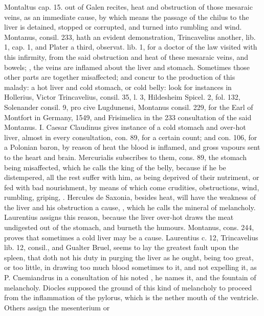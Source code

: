 {{Montaltus cap. 15. out of Galen recites, heat and obstruction of
those mesaraic veins, as an immediate cause, by which means the passage
of the chilus to the liver is detained, stopped or corrupted, and
turned into rumbling and wind. Montanus, consil. 233, hath an evident
demonstration, Trincavelius another, lib. 1, cap. 1, and Plater a
third, observat. lib. 1, for a doctor of the law visited with this
infirmity, from the said obstruction and heat of these mesaraic veins,
and bowels; , the
veins are inflamed about the liver and stomach. Sometimes those other
parts are together misaffected; and concur to the production of this
malady: a hot liver and cold stomach, or cold belly: look for instances
in Hollerius, Victor Trincavelius, consil. 35, l. 3, Hildesheim Spicel.
2, fol. 132, Solenander consil. 9, pro cive Lugdunensi, Montanus
consil. 229, for the Earl of Montfort in Germany, 1549, and Frisimelica
in the 233 consultation of the said Montanus. I. Caesar Claudinus gives
instance of a cold stomach and over-hot liver, almost in every
consultation, con. 89, for a certain count; and con. 106, for a
Polonian baron, by reason of heat the blood is inflamed, and gross
vapours sent to the heart and brain. Mercurialis subscribes to them,
cons. 89, the stomach being misaffected, which he calls the king
of the belly, because if he be distempered, all the rest suffer with
him, as being deprived of their nutriment, or fed with bad nourishment,
by means of which come crudities, obstructions, wind, rumbling,
griping, \etc{}. Hercules de Saxonia, besides heat, will have the weakness
of the liver and his obstruction a cause, ,
which he calls the mineral of melancholy. Laurentius assigns this
reason, because the liver over-hot draws the meat undigested out of the
stomach, and burneth the humours. Montanus, cons. 244, proves that
sometimes a cold liver may be a cause. Laurentius c. 12, Trincavelius
lib. 12, consil., and Gualter Bruel, seems to lay the greatest fault
upon the spleen, that doth not his duty in purging the liver as he
ought, being too great, or too little, in drawing too much blood
sometimes to it, and not expelling it, as P. Cnemiandrus in a
consultation of his noted , he names it, and the
fountain of melancholy. Diocles supposed the ground of this kind of
melancholy to proceed from the inflammation of the pylorus, which is
the nether mouth of the ventricle. Others assign the mesenterium or
}}
